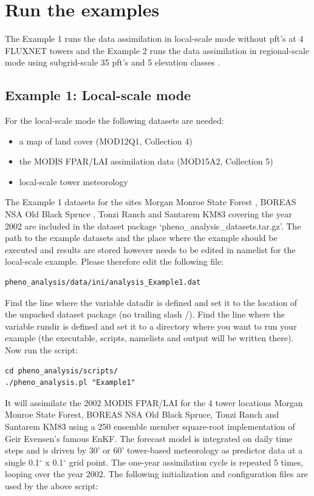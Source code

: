 \documentclass[a4paper,12pt]{article}
\newcommand{\degree}{$^{\circ}$ }
\begin{document}
\section{Run the examples}

The Example 1 runs the data assimilation in local-scale mode without pft's at 4 FLUXNET towers \citep{Stockli2008} and the Example 2 runs the data assimilation in regional-scale mode using subgrid-scale 35 pft's and 5 elevation classes \citep{Stockli2011}.

\subsection{Example 1: Local-scale mode}
For the local-scale mode the following datasets are needed:
\begin{itemize} 
\item a map of land cover (MOD12Q1, Collection 4) 
\item the MODIS FPAR/LAI assimilation data (MOD15A2, Collection 5)
\item local-scale tower meteorology
\end{itemize}
The Example 1 datasets for the sites Morgan Monroe State Forest \citep{Schmid2000}, BOREAS NSA Old Black Spruce \citep{Dunn2007}, Tonzi Ranch \citep{Baldocchi2004} and Santarem KM83 \citep{Goulden2004} covering the year 2002 are included in the dataset package `pheno\_analysis\_datasets.tar.gz'. The path to the example datasets and the place where the example should be executed and results are stored however needs to be edited in namelist for the local-scale example. Please therefore edit the following file:
\begin{verbatim}
pheno_analysis/data/ini/analysis_Example1.dat
\end{verbatim}
Find the line where the variable datadir is defined and set it to the location of the unpacked dataset package (no trailing slash /). 
Find the line where the variable rundir is defined and set it to a directory where you want to run your example (the executable, scripts, namelists and output will be written there).
Now run the script:
\begin{verbatim}
cd pheno_analysis/scripts/
./pheno_analysis.pl "Example1"
\end{verbatim}
It will assimilate the 2002 MODIS FPAR/LAI for the 4 tower locations Morgan Monroe State Forest, BOREAS NSA Old Black Spruce, Tonzi Ranch and Santarem KM83 using a 250 ensemble member square-root implementation of Geir Evensen's famous EnKF. The forecast model is integrated on daily time steps and is driven by 30' or 60' tower-based meteorology as predictor data at a single 0.1\degree x 0.1\degree grid point. The one-year assimilation cycle is repeated 5 times, looping over the year 2002. The following initialization and configuration files are used by the above script:
\end{document}
